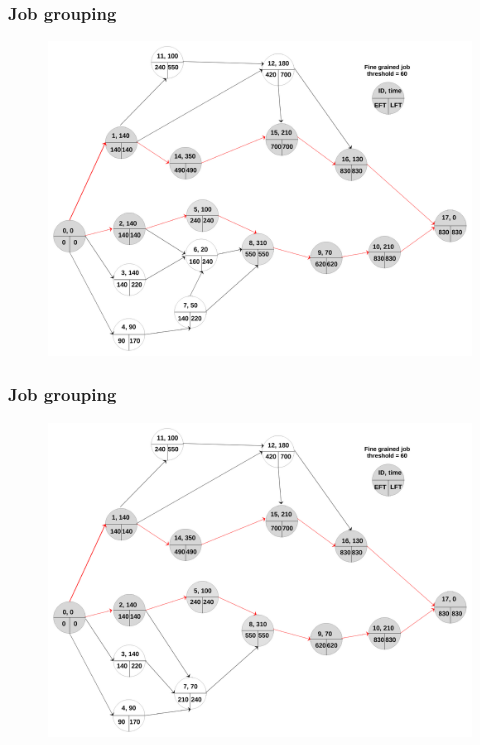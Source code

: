 \documentclass{beamer}
\begin{document}
\begin{frame}
\frametitle{Job grouping \hyperlink{jbgrp}{}}
\begin{figure}[h]
    \centering
    \includegraphics[height=0.77\textheight,width=\textwidth]{imgs/jobgrouping1}
\end{figure}
\end{frame}

\begin{frame}
\frametitle{Job grouping \hyperlink{jbgrp}{}}
\begin{figure}[h]
    \centering
    \includegraphics[height=0.77\textheight,width=\textwidth]{imgs/jobgrouping2}
\end{figure}
\end{frame}
\end{document}
